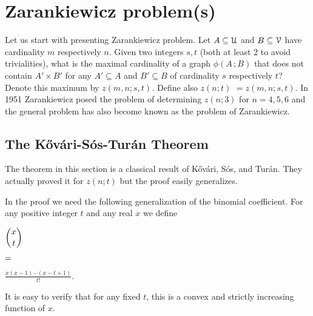 \documentclass[scombinatorics.tex]{subfiles}
\begin{document}
\chapter{Zarankiewicz problem(s)}

\label{zarankiewicz}





\def\medrel#1{\parbox[t]{6ex}{$\displaystyle\hfil #1$}}
\def\ceq#1#2#3{\parbox[t]{25ex}{$\displaystyle #1$}\medrel{#2}{$\displaystyle #3$}}

Let us start with presenting Zarankiewicz problem.
Let $A\subseteq\EuScript U$ and $B\subseteq\EuScript V$ have cardinality $m$ respectively $n$.
Given two integers $s,t$ (both at least $2$ to avoid trivialities), what is the maximal cardinality of a graph $\phi(A\,;B)$ that does not contain $A'\times B'$  for any $A'\subseteq A$ and $B'\subseteq B$ of cardinality $s$ respectively $t$?
Denote this maximum by \emph{$z(m, n; s, t)$.}
Define also \emph{$z(n; t)$} $=z(m, n; s, t)$.
In 1951 Zarankiewicz posed the problem of determining $z(n; 3)$ for $n = 4, 5, 6$ and the  general problem has also become known as the problem of Zarankiewicz.


\section{The K\H{o}v\'ari-S\'os-Tur\'an Theorem}
The theorem in this section is a classical result of K\H{o}v\'ari, S\'os, and Tur\'an.
They actually proved it for $z(n;t)$ but the proof easily generalizes.

In the proof we need the following generalization of the binomial coefficient. 
For any positive integer $t$ and any real $x$ we define

\ceq{\hfill\binom{x}{t}}{=}{\frac{x(x-1)\cdots(x-t+1)}{t!}.}

It is easy to verify that for any fixed $t$, this is a convex and strictly increasing function of $x$.
\end{document}
